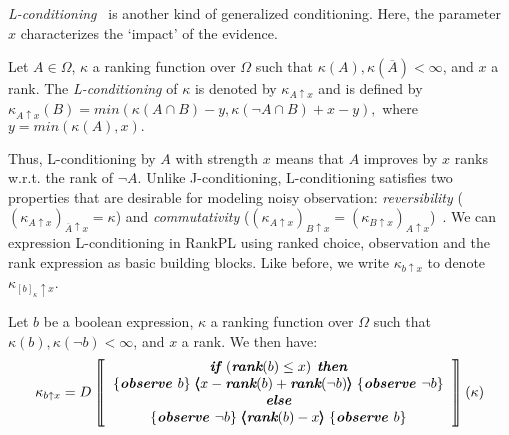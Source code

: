 \documentclass{llncs}
\newcommand{\mods}[2]{[#2]_{#1}}
\newcommand{\Rank}[1]{\hspace{3pt} \pmb{\langle} #1 \pmb{\rangle}\hspace{3pt} } %
\newcommand{\States}{\Omega}
\begin{document}
\emph{L-conditioning}~\cite{goldszmidt1996qualitative} %
is another kind of generalized conditioning.
Here, the parameter $x$ characterizes the `impact' of the evidence. %
\begin{definition}\label{defn:evidenceoriented}
Let $A \in \Omega$, $\kappa$ a ranking function over $\Omega$ such that $\kappa(A), \kappa(\overline A) < \infty$, and $x$ a rank.
The \emph{L-conditioning} of $\kappa$ is denoted by $\kappa_{A \uparrow x}$ and is defined by
	$\kappa_{A \uparrow x}(B) = min ( \kappa(A \cap B) - y, \kappa(\neg A \cap B) + x - y ),$ %
where $y = min(\kappa(A), x).$
\end{definition}
Thus, L-conditioning by $A$ with strength $x$ means that $A$ improves by $x$ ranks w.r.t. the rank of $\neg A$.
Unlike J-conditioning, L-conditioning satisfies two properties 
that are desirable for modeling noisy observation:
	\textit{reversibility} ($(\kappa_{A \uparrow x})_{\overline{A} \uparrow x} = \kappa$) and 
	\textit{commutativity} ($(\kappa_{A \uparrow x})_{B \uparrow x} = (\kappa_{B \uparrow x})_{A \uparrow x}$)~\cite{DBLP:books/daglib/0035277}.
We can expression L-conditioning in RankPL using ranked choice, observation and the rank expression as basic building blocks.
Like before, we write $\kappa_{b \uparrow x}$ to denote $\kappa_{\mods{\kappa}{b} \uparrow x}$.
\begin{theorem}\label{thm:evidenceoriented}
Let $b$ be a boolean expression, $\kappa$ a ranking function over $\States$ such that $\kappa(b), \kappa(\neg b) < \infty$, and $x$ a rank.
We then have:
	$$\kappa_{b \uparrow x} = D
	\left\llbracket\begin{tabular}{c} 
	\mbox{$\emph{\textbf{if }}(\emph{\textbf{rank}}(b) \leq x)\emph{\textbf{ then}}$} \\ %
	\mbox{$\{\emph{\textbf{observe }}b \} \Rank{x - \emph{\textbf{rank}}(b) + \emph{\textbf{rank}}(\neg b)} \{ \emph{\textbf{observe }}\neg b\}$} \\
	\mbox{$\emph{\textbf{else}}$} \\
	\mbox{$\{\emph{\textbf{observe }}\neg b\} \Rank{\emph{\textbf{rank}}(b) - x} \{\emph{\textbf{observe }}b\}$} \\
	\end{tabular}\right\rrbracket(\kappa)$$
\end{theorem}
\end{document}
